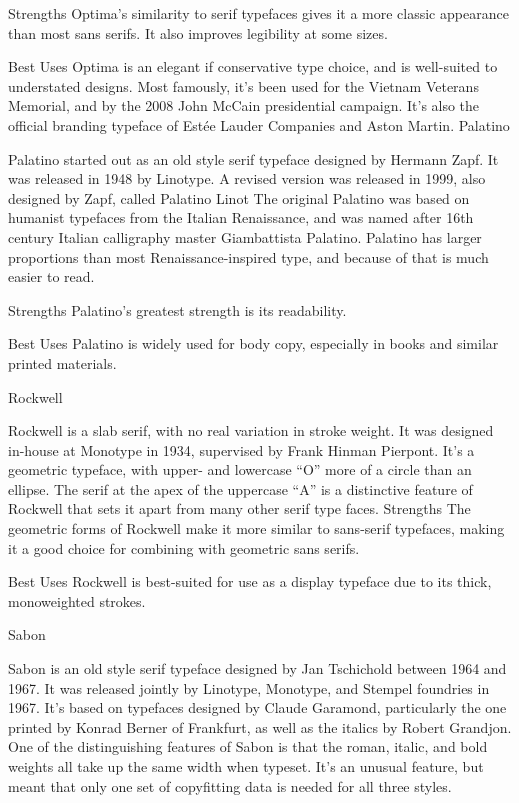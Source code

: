\documentclass[12pt,a4paper,twocolumn]{book} %
\begin{document}
Strengths
Optima’s similarity to serif typefaces gives it a more classic appearance than most sans serifs. It also improves legibility at some sizes.

Best Uses
Optima is an elegant if conservative type choice, and is well-suited to understated designs. Most famously, it’s been used for the Vietnam Veterans Memorial, and by the 2008 John McCain presidential campaign. It’s also the official branding typeface of Estée Lauder Companies and Aston Martin.
Palatino

Palatino started out as an old style serif typeface designed by Hermann Zapf. It was released in 1948 by Linotype. A revised version was released in 1999, also designed by Zapf, called Palatino Linot
The original Palatino was based on humanist typefaces from the Italian Renaissance, and was named after 16th century Italian calligraphy master Giambattista Palatino. Palatino has larger proportions than most Renaissance-inspired type, and because of that is much easier to read.

Strengths
Palatino’s greatest strength is its readability.

Best Uses
Palatino is widely used for body copy, especially in books and similar printed materials.


Rockwell

Rockwell is a slab serif, with no real variation in stroke weight. It was designed in-house at Monotype in 1934, supervised by Frank Hinman Pierpont. It’s a geometric typeface, with upper- and lowercase “O” more of a circle than an ellipse. The serif at the apex of the uppercase “A” is a distinctive feature of Rockwell that sets it apart from many other serif type faces.
Strengths
The geometric forms of Rockwell make it more similar to sans-serif typefaces, making it a good choice for combining with geometric sans serifs.

Best Uses
Rockwell is best-suited for use as a display typeface due to its thick, monoweighted strokes.


Sabon

Sabon is an old style serif typeface designed by Jan Tschichold between 1964 and 1967. It was released jointly by Linotype, Monotype, and Stempel foundries in 1967. It’s based on typefaces designed by Claude Garamond, particularly the one printed by Konrad Berner of Frankfurt, as well as the italics by Robert Grandjon.
One of the distinguishing features of Sabon is that the roman, italic, and bold weights all take up the same width when typeset. It’s an unusual feature, but meant that only one set of copyfitting data is needed for all three styles.
\end{document}
